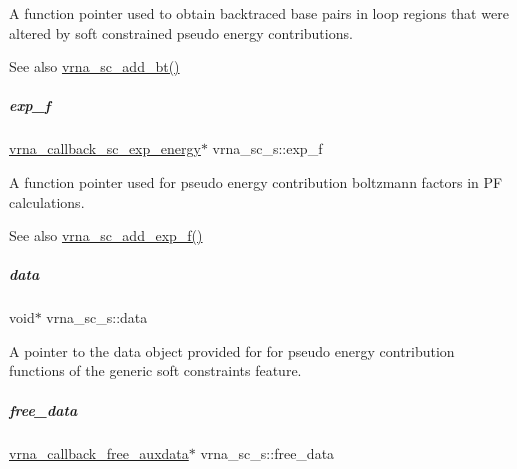 A function pointer used to obtain backtraced base pairs in loop regions that were altered by soft constrained pseudo energy contributions. 

\begin{DoxySeeAlso}{See also}
\mbox{\hyperlink{group__soft__constraints_gabde7d07a79bb9a8f4721aee247b674ea}{vrna\+\_\+sc\+\_\+add\+\_\+bt()}} 
\end{DoxySeeAlso}
\mbox{\label{group__soft__constraints_a0de08a09f3ccf2f97974d23192668ab0}} 
\subparagraph{\texorpdfstring{exp\+\_\+f}{exp\_f}}
{\footnotesize\ttfamily \mbox{\hyperlink{group__soft__constraints_ga4099978d410513edeeff8f3db13144c5}{vrna\+\_\+callback\+\_\+sc\+\_\+exp\+\_\+energy}}$\ast$ vrna\+\_\+sc\+\_\+s\+::exp\+\_\+f}



A function pointer used for pseudo energy contribution boltzmann factors in PF calculations. 

\begin{DoxySeeAlso}{See also}
\mbox{\hyperlink{group__soft__constraints_ga87e382b5d0c9b7d9ce1b79c0473ff700}{vrna\+\_\+sc\+\_\+add\+\_\+exp\+\_\+f()}} 
\end{DoxySeeAlso}
\mbox{\label{group__soft__constraints_a7574680143df97b9029146c2150bf06d}} 
\subparagraph{\texorpdfstring{data}{data}}
{\footnotesize\ttfamily void$\ast$ vrna\+\_\+sc\+\_\+s\+::data}



A pointer to the data object provided for for pseudo energy contribution functions of the generic soft constraints feature. 

\mbox{\label{group__soft__constraints_a05031f5e9e1db014cbae7e8c08048291}} 
\subparagraph{\texorpdfstring{free\+\_\+data}{free\_data}}
{\footnotesize\ttfamily \mbox{\hyperlink{group__fold__compound_ga7806651f51b195013839a218b3bbd5a3}{vrna\+\_\+callback\+\_\+free\+\_\+auxdata}}$\ast$ vrna\+\_\+sc\+\_\+s\+::free\+\_\+data}



